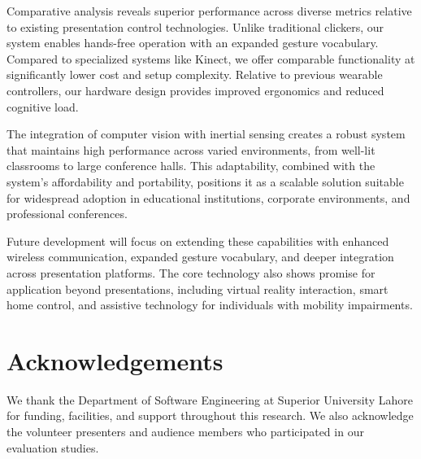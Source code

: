 \documentclass[arxiv,usenatbib]{iupartex}
\begin{document}
Comparative analysis reveals superior performance across diverse metrics relative to existing presentation control technologies. Unlike traditional clickers, our system enables hands-free operation with an expanded gesture vocabulary. Compared to specialized systems like Kinect, we offer comparable functionality at significantly lower cost and setup complexity. Relative to previous wearable controllers, our hardware design provides improved ergonomics and reduced cognitive load.

The integration of computer vision with inertial sensing creates a robust system that maintains high performance across varied environments, from well-lit classrooms to large conference halls. This adaptability, combined with the system's affordability and portability, positions it as a scalable solution suitable for widespread adoption in educational institutions, corporate environments, and professional conferences.

Future development will focus on extending these capabilities with enhanced wireless communication, expanded gesture vocabulary, and deeper integration across presentation platforms. The core technology also shows promise for application beyond presentations, including virtual reality interaction, smart home control, and assistive technology for individuals with mobility impairments.

\section*{Acknowledgements}
We thank the Department of Software Engineering at Superior University Lahore for funding, facilities, and support throughout this research. We also acknowledge the volunteer presenters and audience members who participated in our evaluation studies.
\end{document}
